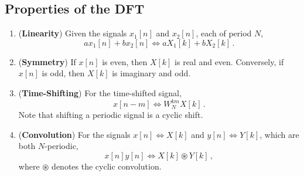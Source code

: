 \subsection{Properties of the DFT}
%
\begin{enumerate}
\item (\textbf{Linearity}) Given the signals $x_1[n]$ and $x_2[n]$, each
  of period $N$,
  \begin{displaymath}
    ax_1[n] + bx_2[n] \Longleftrightarrow aX_1[k] + bX_2[k] \,. 
  \end{displaymath}
\item (\textbf{Symmetry}) If $x[n]$ is even, then $X[k]$ is real and even.
  Conversely, if $x[n]$ is odd, then $X[k]$ is imaginary and odd.
\item (\textbf{Time-Shifting}) For the time-shifted signal,
  \begin{displaymath}
    x[n-m] \Longleftrightarrow W_N^{km}X[k] \,.
  \end{displaymath}
  Note that shifting a periodic signal is a cyclic shift.
\item (\textbf{Convolution}) For the signals $x[n] \Longleftrightarrow X[k]$
  and $y[n] \Longleftrightarrow Y[k]$, which are both $N$-periodic,
  \begin{displaymath}
    x[n]y[n] \Longleftrightarrow X[k]\circledast Y[k] \,,
  \end{displaymath}
  where $\circledast$ denotes the cyclic convolution. 
\end{enumerate}

